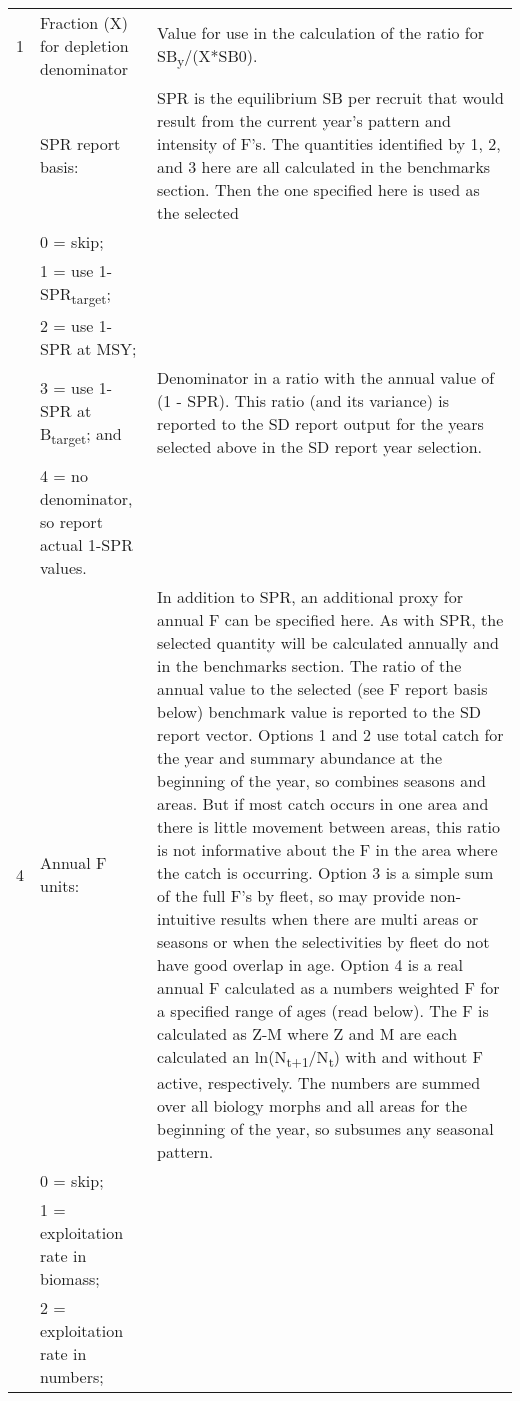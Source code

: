 {\begin{landscape}
\begin{longtable}{p{1.5cm} p{7.2cm} p{12.3cm}}
 \hline
 1 & Fraction (X) for depletion denominator & Value for use in the calculation of the ratio for SB\textsubscript{y}/(X*SB0).\Tstrut\\

 \pagebreak
 1 & SPR report basis: & \multirow{1}{1cm}[-0.25cm]{\parbox{12.5cm}{SPR is the equilibrium SB per recruit that would result from the current year's pattern and intensity of F's.  The quantities identified by 1, 2, and 3 here are all calculated in the benchmarks section.  Then the one specified here is used as the selected }}\Tstrut\\
   & 0 = skip; & \\
   & 1 = use 1-SPR\textsubscript{target}; & \\
   & 2 = use 1-SPR at MSY; & \Tstrut\\
   & 3 = use 1-SPR at B\textsubscript{target}; and & \multirow{1}{1cm}[-0.25cm]{\parbox{12.5cm}{Denominator in a ratio with the annual value of (1 - SPR). This ratio (and its variance) is reported to the SD report output for the years selected above in the SD report year selection.}}\Tstrut\\
   & 4 = no denominator, so report actual 1-SPR values. & \\
  
 \hline 
 4 & Annual F units: &  \multirow{1}{1cm}[-0.25cm]{\parbox{12.5cm}{In addition to SPR, an additional proxy for annual F can be specified here.  As with SPR, the selected quantity will be calculated annually and in the benchmarks section.  The ratio of the annual value to the selected (see F report basis below) benchmark value is reported to the SD report vector.  Options 1 and 2 use total catch for the year and summary abundance at the beginning of the year, so combines seasons and areas.  But if most catch occurs in one area and there is little movement between areas, this ratio is not informative about the F in the area where the catch is occurring.  Option 3 is a simple sum of the full F's by fleet, so may provide non-intuitive results when there are multi areas or seasons or when the selectivities by fleet do not have good overlap in age.  Option 4 is a real annual F calculated as a numbers weighted F for a specified range of ages (read below).  The F is calculated as Z-M where Z and M are each calculated an ln(N\textsubscript{t+1}/N\textsubscript{t}) with and without F active, respectively. The numbers are summed over all biology morphs and all areas for the beginning of the year, so subsumes any seasonal pattern.}}\Tstrut\\
   & 0 = skip; & \\
   & 1 = exploitation rate in biomass; & \\
   & 2 = exploitation rate in numbers; & \\


\end{longtable}
\end{landscape}}

